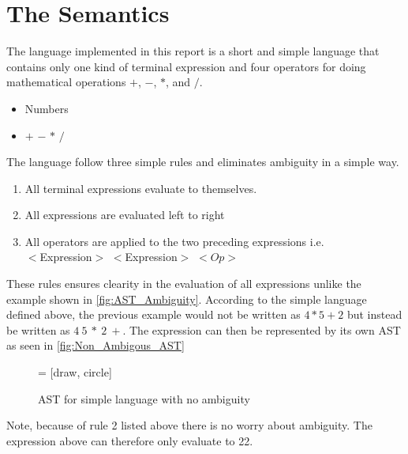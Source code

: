 \section{The Semantics}
The language implemented in this report is a short and simple language
that contains only one kind of terminal expression and four operators
for doing mathematical operations $+$, $-$, $*$, and $/$.

\begin{itemize}
  \item Numbers
  \item $+$ \textbar{} $-$ \textbar{} $*$ \textbar{} $/$
\end{itemize}

\noindent The language follow three simple rules and eliminates ambiguity
in a simple way. 

\begin{enumerate}
  \item All terminal expressions evaluate to themselves.
  \item All expressions are evaluated left to right
  \item All operators are applied to the two preceding expressions i.e.\\
    $<$Expression$>$ $<$Expression$>$ $<Op>$
\end{enumerate}

These rules ensures clearity in the evaluation of all expressions unlike the
example shown in \autoref{fig:AST_Ambiguity}. According to the simple language
defined above, the previous example would not be written as $ 4 * 5 + 2 $
but instead be written as $ 4\ 5\ *\ 2\ + $. The expression can then be represented 
by its own AST as seen in \autoref{fig:Non_Ambigous_AST}

\begin{figure}[h]
  \centering
   = [draw, circle]
  \caption{AST for simple language with no ambiguity}%
  \label{fig:Non_Ambigous_AST}
\end{figure}

Note, because of rule 2 listed above there is no worry about ambiguity. The 
expression above can therefore only evaluate to 22.

\newpage
